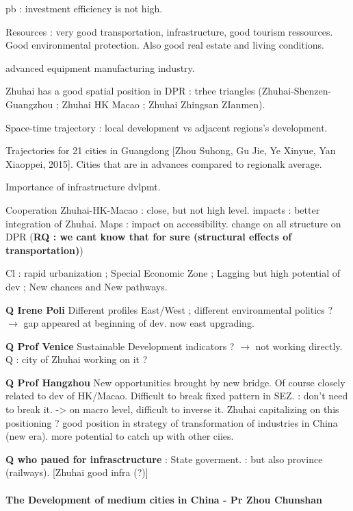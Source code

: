 pb : investment efficiency is not high.

Resources : very good transportation, infrastructure, good tourism ressources. Good environmental protection. Also good real estate and living conditions.

advanced equipment manufacturing industry.

Zhuhai has a good spatial position in DPR : trhee triangles (Zhuhai-Shenzen-Guangzhou ; Zhuhai HK Macao ; Zhuhai Zhingsan ZIanmen).

Space-time trajectory : local development vs adjacent regions's development. 

Trajectories for 21 cities in Guangdong [Zhou Suhong, Gu Jie, Ye Xinyue, Yan Xiaoppei, 2015]. Cities that are in advances compared to regionalk average.

Importance of infrastructure dvlpmt.

Cooperation Zhuhai-HK-Macao : close, but not high level.
impacts : better integration of Zhuhai.
Maps : impact on accessibility. change on all structure on DPR (\textbf{RQ : we cant know that for sure (structural effects of transportation)})

Cl : rapid urbanization ; Special Economic Zone ; Lagging but high potential of dev ; New chances and New pathways.

\textbf{Q Irene Poli} Different profiles East/West ; different environmental politics ? $\rightarrow$ gap appeared at beginning of dev. now east upgrading. 


\textbf{Q Prof Venice} Sustainable Development indicators ? $\rightarrow$ not working directly. Q : city of Zhuhai working on it ?

\textbf{Q Prof Hangzhou} New opportunities brought by new bridge. Of course closely related to dev of HK/Macao. Difficult to break fixed pattern in SEZ. : don't need to break it.
-> on macro level, difficult to inverse it. Zhuhai capitalizing on this positioning ? good position in strategy of transformation of industries in China (new era). more potential to catch up with other ciies. 

\textbf{Q who paued for infrasctructure} : State goverment. : but also province (railways). [Zhuhai good infra (?)]







\paragraph{The Development of medium cities in China - Pr Zhou Chunshan}

